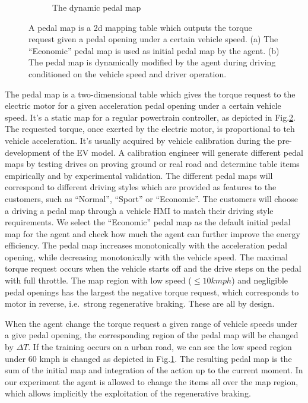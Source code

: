 \documentclass{article}
\begin{document}
\begin{figure}[ht]
\begin{subfigure}[b]{0.45\textwidth}
		\caption{The dynamic pedal map}
		\label{fig:dynamic pedal map}
	\end{subfigure}
	\caption{\label{fig:pedal map} A pedal map is a 2d mapping table which outputs the torque request given a pedal opening under a certain vehicle speed. (a) The ``Economic'' pedal map is used as initial pedal map by the agent. (b) The pedal map is dynamically modified by the agent during driving conditioned on the vehicle speed and driver operation.}
\end{figure}

The pedal map is a two-dimensional table which gives the torque request to the electric motor for a given acceleration pedal opening under a certain vehicle speed. It's a static map for a regular powertrain controller, as depicted in Fig.\@\ref{fig:pedal map}. The requested torque, once exerted by the electric motor, is proportional to teh vehicle acceleration. It's usually acquired by vehicle calibration during the pre-development of the EV model. A calibration engineer will generate different pedal maps by testing drives on proving ground or real road and determine table items empirically and by experimental validation. The different pedal maps will correspond to different driving styles which are provided as features to the customers, such as ``Normal'', ``Sport'' or ``Economic''. The customers will choose a driving a pedal map through a vehicle HMI to match their driving style requirements. We select the ``Economic'' pedal map as the default initial pedal map for the agent and check how much the agent can further improve the energy efficiency. The pedal map increases monotonically with the acceleration pedal opening, while decreasing monotonically with the vehicle speed. The maximal torque request occurs when the vehicle starts off and the drive steps on the pedal with full throttle. The map region with low speed ($\leq10kmph$) and negligible pedal openings has the largest the negative torque request, which corresponds to motor in reverse, i.e.\ strong regenerative braking. These are all by design.

When the agent change the torque request a given range of vehicle speeds under a give pedal opening, the corresponding region of the pedal map will be changed by $\Delta T$. If the training occurs on a urban road, we can see the low speed region under 60 kmph is changed as depicted in Fig.\ref{fig:dynamic pedal map}. The resulting pedal map is the sum of the initial map and integration of the action up to the current moment. In our experiment the agent is allowed to change the items all over the map region, which allows implicitly the exploitation of the regenerative braking.
\end{document}
